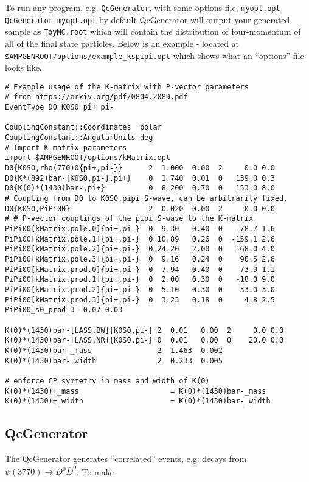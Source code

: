 \documentclass{article}
\begin{document}
To run any program, e.g. \texttt{QcGenerator}, with some options file, \texttt{myopt.opt}
\texttt{QcGenerator myopt.opt}
by default QcGenerator will output your generated sample as \texttt{ToyMC.root} which will contain the distribution of four-momentum of all of the final state particles. 
Below is an example - located at \texttt{\$AMPGENROOT/options/example\_kspipi.opt} which shows what an ``options'' file looks like. 
\begin{lstlisting}
# Example usage of the K-matrix with P-vector parameters
# from https://arxiv.org/pdf/0804.2089.pdf 
EventType D0 K0S0 pi+ pi- 

CouplingConstant::Coordinates  polar
CouplingConstant::AngularUnits deg 
# Import K-matrix parameters 
Import $AMPGENROOT/options/kMatrix.opt
D0{K0S0,rho(770)0{pi+,pi-}}      2  1.000  0.00  2     0.0 0.0 
D0{K*(892)bar-{K0S0,pi-},pi+}    0  1.740  0.01  0   139.0 0.3
D0{K(0)*(1430)bar-,pi+}          0  8.200  0.70  0   153.0 8.0
# Coupling from D0 to K0S0,pipi S-wave, can be arbitrarily fixed.
D0{K0S0,PiPi00}                  2  0.020  0.00  2     0.0 0.0 
# # P-vector couplings of the pipi S-wave to the K-matrix. 
PiPi00[kMatrix.pole.0]{pi+,pi-}  0  9.30   0.40  0   -78.7 1.6
PiPi00[kMatrix.pole.1]{pi+,pi-}  0 10.89   0.26  0  -159.1 2.6
PiPi00[kMatrix.pole.2]{pi+,pi-}  0 24.20   2.00  0   168.0 4.0
PiPi00[kMatrix.pole.3]{pi+,pi-}  0  9.16   0.24  0    90.5 2.6
PiPi00[kMatrix.prod.0]{pi+,pi-}  0  7.94   0.40  0    73.9 1.1
PiPi00[kMatrix.prod.1]{pi+,pi-}  0  2.00   0.30  0   -18.0 9.0
PiPi00[kMatrix.prod.2]{pi+,pi-}  0  5.10   0.30  0    33.0 3.0
PiPi00[kMatrix.prod.3]{pi+,pi-}  0  3.23   0.18  0     4.8 2.5
PiPi00_s0_prod 3 -0.07 0.03

K(0)*(1430)bar-[LASS.BW]{K0S0,pi-} 2  0.01   0.00  2     0.0 0.0
K(0)*(1430)bar-[LASS.NR]{K0S0,pi-} 0  0.01   0.00  0    20.0 0.0
K(0)*(1430)bar-_mass               2  1.463  0.002
K(0)*(1430)bar-_width              2  0.233  0.005

# enforce CP symmetry in mass and width of K(0)
K(0)*(1430)+_mass                     = K(0)*(1430)bar-_mass   
K(0)*(1430)+_width                    = K(0)*(1430)bar-_width
\end{lstlisting}

\subsection{QcGenerator}
The QcGenerator generates ``correlated'' events, e.g. decays from $\psi(3770) \to D^0 \bar{D}^0$. 
To make 
\end{document}
